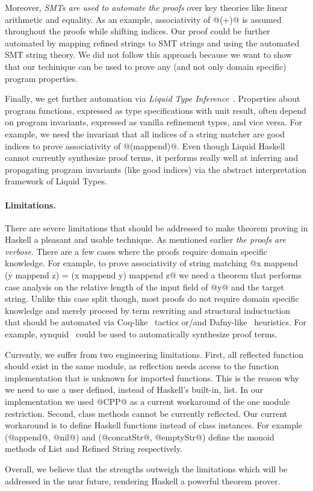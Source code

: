 Moreover, \textit{SMTs are used to automate the proofs}
over key theories like linear arithmetic and equality.
%
As an example, associativity of @(+)@
is assumed throughout the proofs while shifting indices.
%
Our proof could be further automated 
by mapping refined strings to SMT strings and  
using the automated SMT string theory.
%
We did not follow this approach because we want to show that
our techinique can be used to prove any (and not only domain specific)
program properties.

Finally, we get further automation via
\textit{Liquid Type Inference}~\cite{LiquidPLDI08}.
%
Properties about program functions,
expressed as type specifications with unit result,
often depend on program invariants,
expressed as vanilla refinement types, and vice versa.
%
For example, we need the invariant that all indices of
a string matcher are good indices
to prove associativity of @(mappend)@.
%
Even though Liquid Haskell cannot currently synthesize proof terms,
it performs really well at inferring and propagating program invariants (like good indices)
via the abstract interpretation framework of Liquid Types.

\paragraph{Limitations.}
There are severe limitations that should be addressed
to make theorem proving in Haskell a pleasant and usable technique.
%
As mentioned earlier \textit{the proofs are verbose}.
%
There are a few cases where the proofs require domain specific knowledge.
%
For example, to prove associativity of string matching
@x mappend (y mappend z) = (x mappend y) mappend z@
we need a theorem that performs case analysis on the relative length of
the input field of @y@ and the target string.
%
Unlike this case split though, most proofs
do not require domain specific knowledge and merely proceed
by term rewriting and structural inductuction
that should be automated
via Coq-like~\cite{coq-book} tactics or/and Dafny-like~\cite{dafny} heuristics.
%
For example, synquid~\cite{polikarpova16} could be used to automatically
synthesize proof terms.

Currently, we suffer from two engineering limitations.
%
First, all reflected function should exist in the same module,
as reflection needs access to the function implementation
that is unknown for imported functions.
%
This is the reason why we need to use a user defined,
instead of Haskell's built-in, list.
%
In our implementation we used @CPP@ as a current workaround
of the one module restriction.
%
Second, class methods
cannot be currently reflected.
%
Our current workaround is to define Haskell functions instead
of class instances.
For example (@append@, @nil@) and (@concatStr@, @emptyStr@)
define the monoid methods of List and Refined String respectively.

Overall, we believe that the strengths outweigh the limitations which
will be addressed in the near future,
rendering Haskell a powerful theorem prover.

